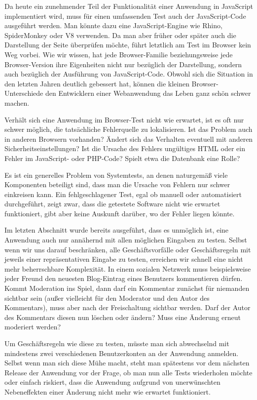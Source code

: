 Da heute ein zunehmender Teil der Funktionalität einer Anwendung in JavaScript implementiert 
wird, muss für einen umfassenden Test auch der JavaScript-Code ausgeführt werden. 
Man könnte dazu eine JavaScript-Engine wie Rhino, SpiderMonkey oder V8 verwenden.
Da man aber früher oder später auch die Darstellung der Seite überprüfen möchte,
führt letztlich am Test im Browser kein Weg vorbei. Wie wir wissen, hat jede 
Browser-Familie beziehungsweise jede Browser-Version ihre Eigenheiten nicht nur bezüglich der
Darstellung, sondern auch bezüglich der Ausführung von JavaScript-Code. Obwohl sich
die Situation in den letzten Jahren deutlich gebessert hat, können die kleinen Browser-
Unterschiede den Entwicklern einer Webanwendung das Leben ganz schön schwer machen.

Verhält sich eine Anwendung im Browser-Test nicht wie erwartet, ist es oft nur schwer möglich,
die tatsächliche Fehlerquelle zu lokalisieren. Ist das Problem auch in anderen Browsern 
vorhanden? Ändert sich das Verhalten eventuell mit anderen Sicherheitseinstellungen?
Ist die Ursache des Fehlers ungültiges HTML oder ein Fehler im JavaScript- oder PHP-Code?
Spielt etwa die Datenbank eine Rolle?

Es ist ein generelles Problem von Systemtests, an denen naturgemäß viele Komponenten
beteiligt sind, dass man die Ursache von Fehlern nur schwer einkreisen kann. Ein fehlgeschlagener
Test, egal ob manuell oder automatisiert durchgeführt, zeigt zwar, dass die getestete
Software nicht wie erwartet funktioniert, gibt aber keine Auskunft darüber, wo der
Fehler liegen könnte.

Im letzten Abschnitt wurde bereits ausgeführt, dass es unmöglich ist, eine Anwendung
auch nur annähernd mit allen möglichen Eingaben zu testen. Selbst wenn wir uns darauf
beschränken, alle Geschäftsvorfälle oder Geschäftsregeln mit jeweils einer repräsentativen
Eingabe zu testen, erreichen wir schnell eine nicht mehr beherrschbare Komplexität. In einem
sozialen Netzwerk muss beispielsweise jeder Freund den neuesten Blog-Eintrag eines
Benutzers kommentieren dürfen. Kommt Moderation ins Spiel, dann darf ein Kommentar
zunächst für niemanden sichtbar sein (außer vielleicht für den Moderator und den Autor
des Kommentars), muss aber nach der Freischaltung sichtbar werden. Darf der Autor
des Kommentars diesen nun löschen oder ändern? Muss eine Änderung erneut moderiert
werden?

Um Geschäftsregeln wie diese zu testen, müsste man sich abwechselnd mit mindestens
zwei verschiedenen Benutzerkonten an der Anwendung anmelden. Selbst wenn man sich
diese Mühe macht, steht man spätestens vor dem nächsten Release der Anwendung vor
der Frage, ob man nun alle Tests wiederholen möchte oder einfach riskiert, dass die 
Anwendung aufgrund von unerwünschten Nebeneffekten einer Änderung nicht mehr wie erwartet
funktioniert.

